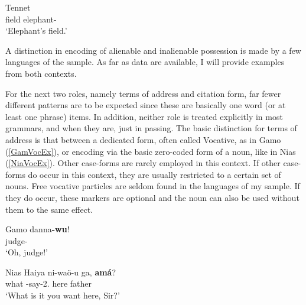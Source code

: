 \pagebreak

\begin{exe} 
\ex\label{TenGenEx} {Tennet} \citep[Surmic; Sudan; ][230]{Randal:1998}\nopagebreak[4]
\gll{}   \\
field \am{} elephant-\gen{}\\
`Elephant's field.'  
\end{exe}
 
A distinction in encoding of alienable and inalienable possession is made by a few languages of the sample. 
As far as data are available, I will provide examples from both contexts.

For the next two roles, namely terms of address and citation form, far fewer different patterns are to be expected since these are basically one word (or at least one phrase) items. 
In addition, neither role is treated explicitly in most grammars, and when they are, just in passing.
The basic distinction for terms of address is that between a dedicated form, often called Vocative, as in Gamo (\ref{GamVocEx}), or encoding via the basic zero-coded form of a noun, like in Nias (\ref{NiaVocEx}). 
Other case-forms are rarely employed in this context. 
If other case-forms do occur in this context, they are usually restricted to a certain set of nouns. 
Free vocative particles are seldom found in the languages of my sample. 
If they do occur, these markers are optional and the noun can also be used without them to the same effect.

\begin{exe}\ex\label{GamVocEx} {Gamo} \citep[Omotic; Ethiopia; ][282, 283]{Hompo:1990}\nopagebreak[4]
\gll danna\textbf{-wu}!\\
judge-\voc{}\\
`Oh, judge!'
\end{exe}

\begin{exe}\ex\label{NiaVocEx} {Nias}  \citep[Sundic; Indonesia; ][59]{Brown:2001}\nopagebreak[4] 
\gll Haiya ni-wa\"o-u ga,  \textbf{am\'a}?\\
what \pass{}-say-2\sg{}.\poss{} here father\\
`What is it you want here, Sir?'
\end{exe}

